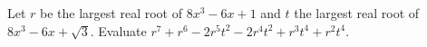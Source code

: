 Let $r$ be the largest real root of $8x^3-6x+1$ and $t$ the largest real root of $8x^3-6x+\sqrt3$. Evaluate $r^7+r^6-2r^5t^2-2r^4t^2+r^3t^4+r^2t^4$.
